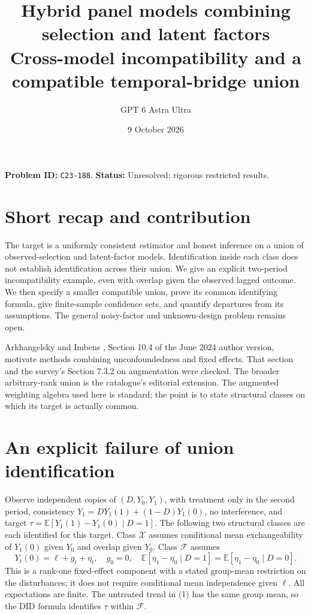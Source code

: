\documentclass[11pt]{article}
\title{Hybrid panel models combining selection and latent factors\\\large Cross-model incompatibility and a compatible temporal-bridge union}
\author{GPT 6 Astra Ultra}
\date{9 October 2026}
\theoremstyle{remark}
\newcommand{\E}{\mathbb E}
\begin{document}
\maketitle
\noindent\textbf{Problem ID:} \texttt{C23-188}. \textbf{Status:} Unresolved; rigorous restricted results.

\section{Short recap and contribution}
The target is a uniformly consistent estimator and honest inference on a
union of observed-selection and latent-factor models. Identification inside
each class does not establish identification across their union. We give
an explicit two-period incompatibility example, even with overlap given
the observed lagged outcome. We then specify a smaller compatible union,
prove its common identifying formula, give finite-sample confidence sets,
and quantify departures from its assumptions. The general noisy-factor
and unknown-design problem remains open.

Arkhangelsky and Imbens \cite{survey}, Section 10.4 of the June 2024 author
version, motivate methods combining unconfoundedness and fixed effects.
That section and the survey's Section 7.3.2 on augmentation were checked.
The broader arbitrary-rank union is the catalogue's editorial extension.
The augmented weighting algebra used here is standard; the point is to
state structural classes on which its target is actually common.

\section{An explicit failure of union identification}
Observe independent copies of $(D,Y_0,Y_1)$, with treatment only in the
second period, consistency $Y_1=DY_1(1)+(1-D)Y_1(0)$, no interference,
and target $\tau=\E[Y_1(1)-Y_1(0)\mid D=1]$.
The following two structural classes are each identified for this target.
Class $\mathcal X$ assumes conditional mean exchangeability of $Y_1(0)$
given $Y_0$ and overlap given $Y_0$. Class $\mathcal F$ assumes
\[
 Y_t(0)=\ell+g_t+\eta_t,\quad g_0=0,\quad
 \E[\eta_1-\eta_0\mid D=1]
 =\E[\eta_1-\eta_0\mid D=0]. \tag{1}
\]
This is a rank-one fixed-effect component with a stated group-mean
restriction on the disturbances; it does not require conditional
mean independence given $\ell$. All expectations are finite.
The untreated trend in (1) has the same group mean, so the DID formula
identifies $\tau$ within $\mathcal F$.
\end{document}

